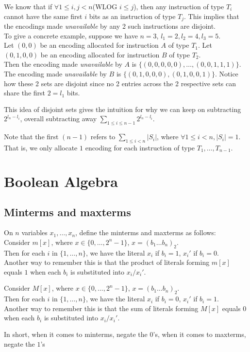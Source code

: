 \documentclass{article}
\begin{document}
We know that if $\forall 1\leq i,j<n$(WLOG $i\leq j$), then any instruction of type $T_i$ cannot have the same first $i$ bits as an instruction of type $T_j$. This implies that the encodings made \textit{unavailable} by any 2 such instructions are disjoint.\\
To give a concrete example, suppose we have $n=3$, $l_1=2,l_2=4,l_3=5$. \\
Let $(0,0)$ be an encoding allocated for instruction $A$ of type $T_1$. Let $(0,1,0,0)$ be an encoding allocated for instruction $B$ of type $T_2$.\\
Then the encoding made \textit{unavailable} by $A$ is $\{(0,0,0,0,0),\dots, (0,0,1,1,1)\}$. The encoding made \textit{unavailable} by $B$ is $\{(0,1,0,0,0),(0,1,0,0,1)\}$. Notice how these 2 sets are disjoint since no 2 entries across the 2 respective sets can share the first $2=l_1$ bits.

This idea of disjoint sets gives the intuition for why we can keep on subtracting $2^{l_n-l_i}$, overall subtracting away $\sum_{1\leq i\leq n-1}2^{l_n-l_i}$.

Note that the first $(n-1)$ refers to $\sum_{1\leq i< n} |S_i|$, where $\forall 1\leq i<n,|S_i|=1$. That is, we only allocate $1$ encoding for each instruction of type $T_1,\dots,T_{n-1}$.

\section{Boolean Algebra}
\subsection{Minterms and maxterms}
On $n$ variables $x_1,\dots ,x_n$, define the minterms and maxterms as follows: \\
Consider $m[x]$, where $x\in \{0,\dots,2^n-1\}$, $x=(b_1\dots b_n)_2$.\\
Then for each $i$ in $\{1,\dots, n\}$, we have the literal $x_i$ if $b_i=1$, $x_i'$ if $b_i=0$.\\
Another way to remember this is that the product of literals forming $m[x]$ equals $1$ when each $b_i$ is substituted into $x_i/x_i'$. 

Consider $M[x]$, where $x\in \{0,\dots,2^n-1\}$, $x=(b_1\dots b_n)_2$.\\
Then for each $i$ in $\{1,\dots, n\}$, we have the literal $x_i$ if $b_i=0$, $x_i'$ if $b_i=1$.\\
Another way to remember this is that the sum of literals forming $M[x]$ equals $0$ when each $b_i$ is substituted into $x_i/x_i'$. 

In short, when it comes to minterms, negate the $0$'s, when it comes to maxterms, negate the $1$'s
\end{document}
